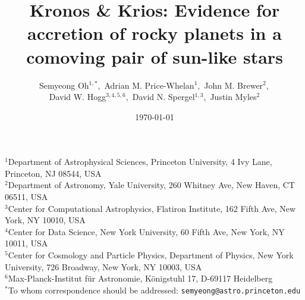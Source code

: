 \documentclass[12pt,letterpaper,margin=1in]{article}
\title{
\vspace{-2cm}
  Kronos \& Krios: Evidence for accretion of rocky planets in a comoving pair of sun-like stars
  \vspace{-0.5cm}
}
\author{
  Semyeong Oh$^{1,*}$,\,
  Adrian M. Price-Whelan$^{1}$,\,
  John M. Brewer$^{2}$,\,\\
  David W. Hogg$^{3,4,5,6}$,\,
  David N. Spergel$^{1,3}$,\,
  Justin Myles$^{2}$
}
\date{\small\today}
\begin{document}
\sloppy\sloppypar\raggedbottom\frenchspacing %
\maketitle

\vspace{-1cm}
{\small\noindent
  $^1$Department of Astrophysical Sciences, Princeton University, 4 Ivy Lane, Princeton, NJ 08544, USA \\
  $^2$Department of Astronomy, Yale University, 260 Whitney Ave, New Haven, CT 06511, USA \\
  $^3$Center for Computational Astrophysics, Flatiron Institute, 162 Fifth Ave, New York, NY 10010, USA \\
  $^4$Center for Data Science, New York University, 60 Fifth Ave, New York, NY 10011, USA \\
  $^5$Center for Cosmology and Particle Physics, Department of Physics, New York University, 726 Broadway, New York, NY 10003, USA \\
  $^6$Max-Planck-Institut f\"ur Astronomie, K\"onigstuhl 17, D-69117 Heidelberg \\
  $^*$To whom correspondence should be addressed: \texttt{semyeong@astro.princeton.edu}
}





\end{document}
